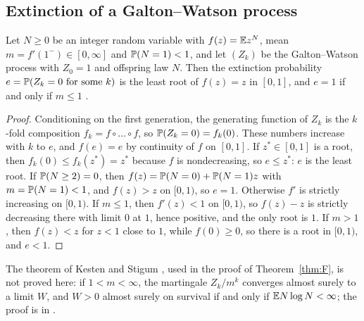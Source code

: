\subsection{Extinction of a Galton--Watson process}\label{app:gw}

Let $N\ge0$ be an integer random variable with $f(z)=\mathbb{E} z^{N}$, mean $m=f'(1^{-})\in[0,\infty]$ and $\mathbb{P}(N=1)<1$, and let $(Z_{k})$ be the Galton--Watson process with $Z_{0}=1$ and offspring law $N$. Then the extinction probability $e=\mathbb{P}(Z_{k}=0\text{ for some }k)$ is the least root of $f(z)=z$ in $[0,1]$, and $e=1$ if and only if $m\le1$ \cite{AN72,WG75}.

\begin{proof}
Conditioning on the first generation, the generating function of $Z_{k}$ is the $k$-fold composition $f_{k}=f\circ\dots\circ f$, so $\mathbb{P}(Z_{k}=0)=f_{k}(0)$. These numbers increase with $k$ to $e$, and $f(e)=e$ by continuity of $f$ on $[0,1]$. If $z^{\ast}\in[0,1]$ is a root, then $f_{k}(0)\le f_{k}(z^{\ast})=z^{\ast}$ because $f$ is nondecreasing, so $e\le z^{\ast}$: $e$ is the least root. If $\mathbb{P}(N\ge2)=0$, then $f(z)=\mathbb{P}(N=0)+\mathbb{P}(N=1)z$ with $m=\mathbb{P}(N=1)<1$, and $f(z)>z$ on $[0,1)$, so $e=1$. Otherwise $f'$ is strictly increasing on $[0,1)$. If $m\le1$, then $f'(z)<1$ on $[0,1)$, so $f(z)-z$ is strictly decreasing there with limit $0$ at $1$, hence positive, and the only root is $1$. If $m>1$, then $f(z)<z$ for $z<1$ close to $1$, while $f(0)\ge0$, so there is a root in $[0,1)$, and $e<1$.
\end{proof}

The theorem of Kesten and Stigum \cite{KS66}, used in the proof of Theorem~\ref{thm:F}, is not proved here: if $1<m<\infty$, the martingale $Z_{k}/m^{k}$ converges almost surely to a limit $W$, and $W>0$ almost surely on survival if and only if $\mathbb{E} N\log N<\infty$; the proof is in \cite[Chapter~I]{AN72}.
